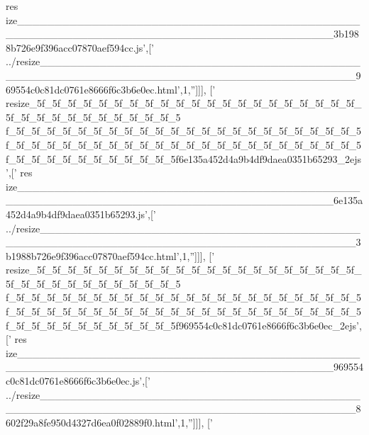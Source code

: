 \begin{DoxyCode}
{      res
      ize\_\_\_\_\_\_\_\_\_\_\_\_\_\_\_\_\_\_\_\_\_\_\_\_\_\_\_\_\_\_\_\_\_\_\_\_\_\_\_\_\_\_\_\_\_\_\_\_\_\_\_\_\_\_\_\_\_\_\_\_\_\_\_\_\_\_\_\_\_\_\_\_\_\_\_\_\_\_\_\_\_\_\_\_\_\_\_\_\_\_3b1988b726e9f396acc07870aef594cc.js'},[\textcolor{stringliteral}{'
      ../resize\_\_\_\_\_\_\_\_\_\_\_\_\_\_\_\_\_\_\_\_\_\_\_\_\_\_\_\_\_\_\_\_\_\_\_\_\_\_\_\_\_\_\_\_\_\_\_\_\_\_\_\_\_\_\_\_\_\_\_\_\_\_\_\_\_\_\_\_\_\_\_\_\_\_\_\_\_\_\_\_\_\_\_\_\_\_\_\_\_\_969554c0c81dc0761e8666f6c3b6e0ec.html'},1,\textcolor{stringliteral}{''}]]],
  [\textcolor{stringliteral}{'
      resize\_5f\_5f\_5f\_5f\_5f\_5f\_5f\_5f\_5f\_5f\_5f\_5f\_5f\_5f\_5f\_5f\_5f\_5f\_5f\_5f\_5f\_5f\_5f\_5f\_5f\_5f\_5f\_5f\_5f\_5f\_5f\_5f\_5
      f\_5f\_5f\_5f\_5f\_5f\_5f\_5f\_5f\_5f\_5f\_5f\_5f\_5f\_5f\_5f\_5f\_5f\_5f\_5f\_5f\_5f\_5f\_5f\_5f\_5f\_5f\_5f\_5f\_5f\_5f\_5f\_5f\_5f\_5f\_5f\_5f\_5f\_5f\_5f\_5f\_5f\_5f\_5f\_5f\_5f\_5f\_5f\_5f\_5f\_5f\_5f\_5f\_5f\_5f\_5f\_5f\_5f6e135a452d4a9b4df9daea0351b65293\_2ejs'},[\textcolor{stringliteral}{'
      res
      ize\_\_\_\_\_\_\_\_\_\_\_\_\_\_\_\_\_\_\_\_\_\_\_\_\_\_\_\_\_\_\_\_\_\_\_\_\_\_\_\_\_\_\_\_\_\_\_\_\_\_\_\_\_\_\_\_\_\_\_\_\_\_\_\_\_\_\_\_\_\_\_\_\_\_\_\_\_\_\_\_\_\_\_\_\_\_\_\_\_\_6e135a452d4a9b4df9daea0351b65293.js'},[\textcolor{stringliteral}{'
      ../resize\_\_\_\_\_\_\_\_\_\_\_\_\_\_\_\_\_\_\_\_\_\_\_\_\_\_\_\_\_\_\_\_\_\_\_\_\_\_\_\_\_\_\_\_\_\_\_\_\_\_\_\_\_\_\_\_\_\_\_\_\_\_\_\_\_\_\_\_\_\_\_\_\_\_\_\_\_\_\_\_\_\_\_\_\_\_\_\_\_\_3b1988b726e9f396acc07870aef594cc.html'},1,\textcolor{stringliteral}{''}]]],
  [\textcolor{stringliteral}{'
      resize\_5f\_5f\_5f\_5f\_5f\_5f\_5f\_5f\_5f\_5f\_5f\_5f\_5f\_5f\_5f\_5f\_5f\_5f\_5f\_5f\_5f\_5f\_5f\_5f\_5f\_5f\_5f\_5f\_5f\_5f\_5f\_5f\_5
      f\_5f\_5f\_5f\_5f\_5f\_5f\_5f\_5f\_5f\_5f\_5f\_5f\_5f\_5f\_5f\_5f\_5f\_5f\_5f\_5f\_5f\_5f\_5f\_5f\_5f\_5f\_5f\_5f\_5f\_5f\_5f\_5f\_5f\_5f\_5f\_5f\_5f\_5f\_5f\_5f\_5f\_5f\_5f\_5f\_5f\_5f\_5f\_5f\_5f\_5f\_5f\_5f\_5f\_5f\_5f\_5f\_5f969554c0c81dc0761e8666f6c3b6e0ec\_2ejs'},[\textcolor{stringliteral}{'
      res
      ize\_\_\_\_\_\_\_\_\_\_\_\_\_\_\_\_\_\_\_\_\_\_\_\_\_\_\_\_\_\_\_\_\_\_\_\_\_\_\_\_\_\_\_\_\_\_\_\_\_\_\_\_\_\_\_\_\_\_\_\_\_\_\_\_\_\_\_\_\_\_\_\_\_\_\_\_\_\_\_\_\_\_\_\_\_\_\_\_\_\_969554c0c81dc0761e8666f6c3b6e0ec.js'},[\textcolor{stringliteral}{'
      ../resize\_\_\_\_\_\_\_\_\_\_\_\_\_\_\_\_\_\_\_\_\_\_\_\_\_\_\_\_\_\_\_\_\_\_\_\_\_\_\_\_\_\_\_\_\_\_\_\_\_\_\_\_\_\_\_\_\_\_\_\_\_\_\_\_\_\_\_\_\_\_\_\_\_\_\_\_\_\_\_\_\_\_\_\_\_\_\_\_\_\_8602f29a8fe950d4327d6ea0f02889f0.html'},1,\textcolor{stringliteral}{''}]]],
  [\textcolor{stringliteral}{'
}
\end{DoxyCode}
